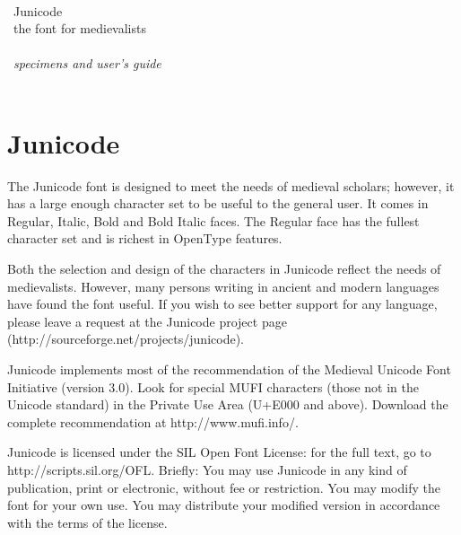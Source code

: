 \documentclass[12pt,a4paper,openany]{book}
\begin{document}
\begin{titlepage}
\huge\noindent
{\color{myRed}}\\[5cm]
\Huge \hfill {\color{myBlue}Junicode}\hfill \\[1cm]
\huge \hfill the font for medievalists\hfill \\[1cm]
 \Huge\hfill {\color{myRed}}\hfill \\[1cm]
 \huge\hfill {\itshape specimens and user’s guide}\hfill \\
\vfill
{\color{myRed}}
\end{titlepage}
\mainmatter
{}
\chapter*{\color{myBlue}Junicode}
\large

\noindent The Junicode font is designed to
meet the needs of medieval scholars; however, it has a large enough
character set to be useful to the general user. It comes in Regular,
Italic, Bold and Bold Italic faces. The Regular face has the fullest
character set and is richest in OpenType features.

Both the selection and design of the characters in Junicode reflect
the needs of medievalists.  However, many persons writing in ancient
and modern languages have found the font useful. If you wish to see
better support for any language, please leave a request at the
Junicode project page (http://sourceforge.net/projects/junicode).

Junicode implements most of the recommendation of the Medieval Unicode
Font Initiative (version 3.0).  Look for special MUFI characters
(those not in the Unicode standard) in the Private Use Area (U+E000
and above). Download the complete recommendation at
http://www.mufi.info/.

Junicode is licensed under the SIL Open Font License: for the full
text, go to
http://scripts.sil.org/OFL. Briefly: You may use Junicode in any
kind of publication, print or electronic, without fee or
restriction. You may modify the font for your own use. You may
distribute your modified version in accordance with the terms of the
license.

\begin{center}
\Huge\color{myRed}
\end{center}
\end{document}
